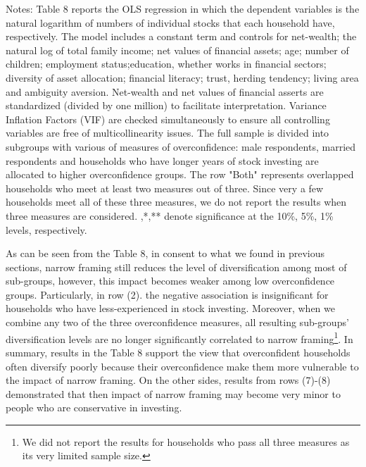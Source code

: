 \documentclass[ukenglish,nottitlepage,thmsb,11pt,letterpaper]{article}
\begin{document}
\begin{table}[H]
\begin{tablenotes}
		\item Notes: Table 8 reports the OLS regression in which the dependent variables is the natural logarithm of numbers of individual stocks that each household have, respectively. The model includes a constant term and controls for net-wealth; the natural log of total family income; net values of financial assets; age; number of children; employment status;education, whether works in financial sectors; diversity of asset allocation; financial literacy; trust, herding tendency; living area and ambiguity aversion. Net-wealth and net values of financial asserts are standardized (divided by one million) to facilitate interpretation. Variance Inflation Factors (VIF) are checked simultaneously to ensure all controlling variables are free of multicollinearity issues. The full sample is divided into subgroups with various of measures of overconfidence: male respondents, married respondents and  households who have longer years of stock investing are allocated to higher overconfidence groups. The row "Both" represents overlapped households who meet at least two measures out of three. Since very a few households meet all of these three measures, we do not report the results when three measures are considered. {\tiny*},{\tiny**},{\tiny***} denote significance at the 10\%, 5\%, 1\% levels, respectively.  
	\end{tablenotes}
\end{table}%

As can be seen from the Table 8, in consent to what we found in previous sections, narrow framing still reduces the level of diversification among most of sub-groups, however, this impact becomes weaker among low overconfidence groups. Particularly, in row (2). the negative association is insignificant for households who have less-experienced in stock investing. Moreover, when we combine any two of the three overconfidence measures, all resulting sub-groups' diversification levels are no longer significantly correlated to narrow framing\footnote{We did not report the results for households who pass all three measures as its very limited sample size.}. In summary, results in the Table 8 support the view that overconfident households often diversify poorly because their overconfidence make them  more vulnerable to the impact of narrow framing. On the other sides, results from rows (7)-(8) demonstrated that then impact of narrow framing may become very minor to people who are conservative in investing. 
\newpage
\end{document}
